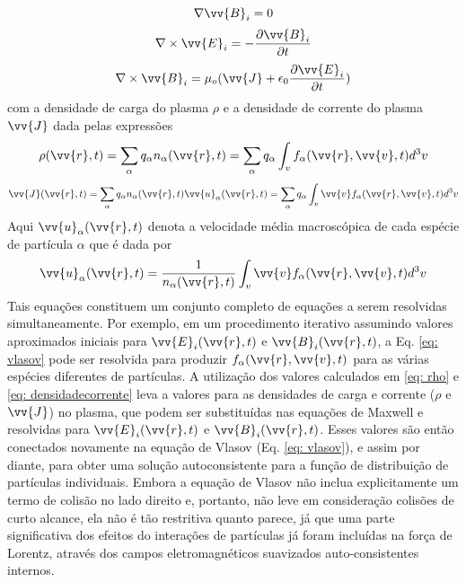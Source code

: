 \documentclass[12pt,oneside,a4paper]{abntex2}
\theoremstyle{definition}  %
\begin{document}
\begin{equation}
\nabla \vv{B}_i = 0
\end{equation}
\begin{equation}
\nabla \times \vv{E}_i = -\frac{\partial \vv{B}_i}{\partial t}
\end{equation}
\begin{equation}
\nabla \times \vv{B}_i = \mu_o (\vv{J} + \epsilon_0 \frac{\partial \vv{E}_i}{\partial t} )
\end{equation}
com a densidade de carga do plasma $\rho$ e a densidade de corrente do plasma $\vv{J}$ dada pelas expressões
\begin{equation}
\label{eq: rho}
\rho(\vv{r},t) = \sum_\alpha q_\alpha n_\alpha(\vv{r},t) = \sum_\alpha q_\alpha \int_v f_\alpha(\vv{r},\vv{v},t) d^3v
\end{equation}
\begin{equation}
\label{eq: densidadecorrente}
\vv{J}(\vv{r},t) = \sum_\alpha q_\alpha n_\alpha(\vv{r},t) \vv{u}_\alpha(\vv{r},t) = \sum_\alpha  q_\alpha \int_v \vv{v} f_\alpha(\vv{r},\vv{v},t) d^3v
\end{equation}
Aqui $ \vv{u}_\alpha(\vv{r},t)$ denota a velocidade média macroscópica de cada espécie de partícula $\alpha$ que é dada por
\begin{equation}
\vv{u}_\alpha(\vv{r},t) = \frac{1}{n_\alpha(\vv{r},t)} \int_v \vv{v} f_\alpha(\vv{r},\vv{v},t) d^3v
\end{equation}
Tais equações constituem um conjunto completo de equações a serem resolvidas simultaneamente. Por exemplo, em um procedimento iterativo assumindo valores aproximados iniciais para $\vv{E}_i(\vv{r}, t)$ e $\vv{B}_i(\vv{r}, t)$, a Eq. \ref{eq: vlasov} pode ser resolvida para produzir $f_\alpha(\vv{r},\vv{v},t)$ para as várias espécies diferentes de partículas. A utilização dos valores calculados em \ref{eq: rho} e \ref{eq: densidadecorrente} leva a valores para as densidades de carga e corrente ($\rho$ e  $\vv{J}$) no plasma, que podem ser substituídas nas equações de Maxwell e resolvidas para $\vv{E}_i(\vv{r}, t)$ e $\vv{B}_i(\vv{r}, t)$. Esses valores são então conectados novamente na equação de Vlasov (Eq. \ref{eq: vlasov}), e assim por diante, para obter uma solução autoconsistente para a função de distribuição de partículas individuais. Embora a equação de Vlasov não inclua explicitamente um termo de colisão no lado direito e, portanto, não leve em consideração colisões de curto alcance, ela não é tão restritiva quanto parece, já que uma parte significativa dos efeitos do interações de partículas já foram incluídas na força de Lorentz, através dos campos eletromagnéticos suavizados auto-consistentes internos.
\end{document}
